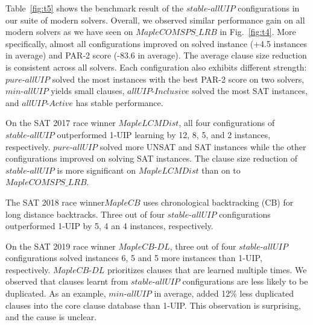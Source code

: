 \documentclass[runningheads]{llncs}
\newcommand{\allUip}{\textit{stable-allUIP}}
\newcommand{\allUipPure}{\textit{pure-allUIP}\xspace}
\newcommand{\allUipMin}{\textit{min-allUIP}\xspace}
\newcommand{\allUipAct}{\textit{allUIP-Active}}
\newcommand{\allUipIn}{\textit{allUIP-Inclusive}}
\newcommand{\MapleBase}{\textit{MapleCOMSPS\_LRB}}
\newcommand{\MapleSeven}{\textit{MapleLCMDist}}
\newcommand{\MapleNineShort}{\textit{MapleCB-DL} }
\newcommand{\MapleEightShort}{\textit{MapleCB}}
\begin{document}
Table~\ref{fig:t5} shows the benchmark result of the $\allUip$
configurations in our suite of modern solvers. Overall, we observed
similar performance gain on all modern solvers as we have seen on
$\MapleBase$ in Fig.~\ref{fig:t4}. More specifically, almost all
configurations improved on solved instance (+4.5 instances in average)
and PAR-2 score (-83.6 in average).  The average clause size reduction
is consistent across all solvers. Each configuration also exhibits
different strength: $\allUipPure$ solved the most instances with the
best PAR-2 score on two solvers, $\allUipMin$ yields small clauses,
$\allUipIn$ solved the most SAT instances, and $\allUipAct$ has stable
performance.


On the SAT 2017 race winner $\MapleSeven$, all four configurations of
$\allUip$ outperformed 1-UIP learning by 12, 8, 5, and 2 instances,
respectively. $\allUipPure$ solved more UNSAT and SAT instances while
the other configurations improved on solving SAT instances. The clause
size reduction of $\allUip$ is more significant on $\MapleSeven$
than on to $\MapleBase$.

The SAT 2018 race winner$\MapleEightShort$ uses chronological
backtracking (CB) for long distance backtracks. Three out of four
$\allUip$ configurations outperformed 1-UIP by 5, 4 an 4 instances,
respectively.


On the SAT 2019 race winner $\MapleNineShort$, three out of four
$\allUip$ configurations solved instances 6, 5 and 5 more instances
than 1-UIP, respectively. $\MapleNineShort$ prioritizes clauses that
are learned multiple times. We observed that clauses learnt from
$\allUip$ configurations are less likely to be duplicated. As an
example, $\allUipMin$ in average, added 12\% less duplicated clauses
into the core clause database than 1-UIP. This observation is
surprising, and the cause is unclear.
\end{document}
